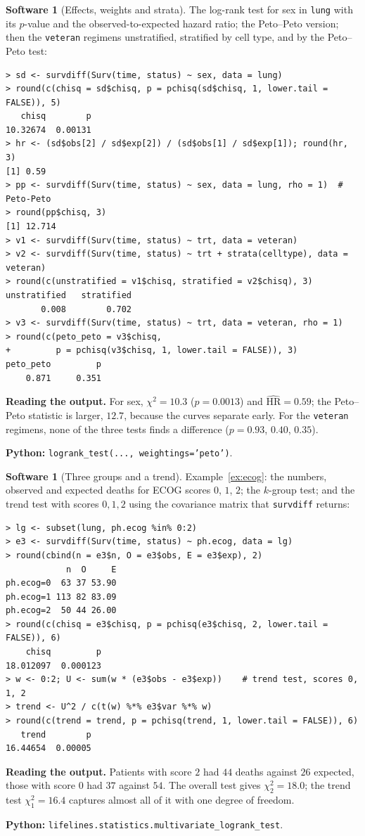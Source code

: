 \documentclass[11pt,a4paper]{article}
\numberwithin{equation}{section}
\theoremstyle{definition}
\newtheorem{software}[thm]{Software}
\begin{document}
\begin{software}[Effects, weights and strata]
\label{sw:weighted}
The log-rank test for sex in \texttt{lung} with its $p$-value and the observed-to-expected hazard ratio; the Peto--Peto version; then the \texttt{veteran} regimens unstratified, stratified by cell type, and by the Peto--Peto test:
{\small\begin{verbatim}
> sd <- survdiff(Surv(time, status) ~ sex, data = lung)
> round(c(chisq = sd$chisq, p = pchisq(sd$chisq, 1, lower.tail = FALSE)), 5)
   chisq        p 
10.32674  0.00131 
> hr <- (sd$obs[2] / sd$exp[2]) / (sd$obs[1] / sd$exp[1]); round(hr, 3)
[1] 0.59
> pp <- survdiff(Surv(time, status) ~ sex, data = lung, rho = 1)  # Peto-Peto
> round(pp$chisq, 3)
[1] 12.714
> v1 <- survdiff(Surv(time, status) ~ trt, data = veteran)
> v2 <- survdiff(Surv(time, status) ~ trt + strata(celltype), data = veteran)
> round(c(unstratified = v1$chisq, stratified = v2$chisq), 3)
unstratified   stratified 
       0.008        0.702 
> v3 <- survdiff(Surv(time, status) ~ trt, data = veteran, rho = 1)
> round(c(peto_peto = v3$chisq,
+         p = pchisq(v3$chisq, 1, lower.tail = FALSE)), 3)
peto_peto         p 
    0.871     0.351 
\end{verbatim}}
\textbf{Reading the output.} For sex, $\chi^2 = 10.3$ ($p = 0.0013$) and $\widehat{\text{HR}} = 0.59$; the Peto--Peto statistic is larger, $12.7$, because the curves separate early. For the \texttt{veteran} regimens, none of the three tests finds a difference ($p = 0.93$, $0.40$, $0.35$).

\textbf{Python:} \texttt{logrank\_test(..., weightings='peto')}.
\end{software}

\begin{software}[Three groups and a trend]
\label{sw:ecog}
Example~\ref{ex:ecog}: the numbers, observed and expected deaths for ECOG scores $0$, $1$, $2$; the $k$-group test; and the trend test with scores $0, 1, 2$ using the covariance matrix that \texttt{survdiff} returns:
{\small\begin{verbatim}
> lg <- subset(lung, ph.ecog %in% 0:2)
> e3 <- survdiff(Surv(time, status) ~ ph.ecog, data = lg)
> round(cbind(n = e3$n, O = e3$obs, E = e3$exp), 2)
            n  O     E
ph.ecog=0  63 37 53.90
ph.ecog=1 113 82 83.09
ph.ecog=2  50 44 26.00
> round(c(chisq = e3$chisq, p = pchisq(e3$chisq, 2, lower.tail = FALSE)), 6)
    chisq         p 
18.012097  0.000123 
> w <- 0:2; U <- sum(w * (e3$obs - e3$exp))    # trend test, scores 0, 1, 2
> trend <- U^2 / c(t(w) %*% e3$var %*% w)
> round(c(trend = trend, p = pchisq(trend, 1, lower.tail = FALSE)), 6)
   trend        p 
16.44654  0.00005 
\end{verbatim}}
\textbf{Reading the output.} Patients with score $2$ had $44$ deaths against $26$ expected, those with score $0$ had $37$ against $54$. The overall test gives $\chi^2_2 = 18.0$; the trend test $\chi^2_1 = 16.4$ captures almost all of it with one degree of freedom.

\textbf{Python:} \texttt{lifelines.statistics.multivariate\_logrank\_test}.
\end{software}
\end{document}
